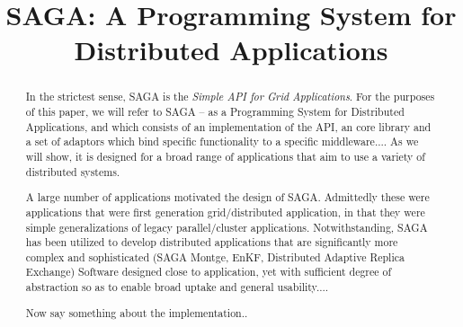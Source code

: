\documentclass[10pt,letterpaper]{article}
\begin{document}
\title{SAGA: A Programming System for Distributed Applications} 

\begin{abstract}
  
  In the strictest sense, SAGA is the {\it Simple API for Grid Applications}. 
  For the purposes of this paper, we will refer to SAGA -- as a Programming
  System for Distributed Applications, and which consists of an implementation
  of the API, an core library and a set of adaptors which bind specific
  functionality to a specific middleware....
  As we will show, it is designed for a broad range of applications
  that aim to use a variety of distributed systems.
   
  A large number of applications motivated the design of SAGA.
  Admittedly these were applications that were
  first generation grid/distributed application, in that
  they were simple generalizations of legacy parallel/cluster
  applications.
  Notwithstanding, SAGA has been utilized to develop distributed
  applications that are significantly more complex and sophisticated
  (SAGA Montge, EnKF, Distributed Adaptive Replica Exchange)
  Software designed close to application, yet with sufficient
  degree of abstraction so as to enable broad uptake and general
  usability....

  Now say something about the implementation..
\end{abstract}

\maketitle
\end{document}
